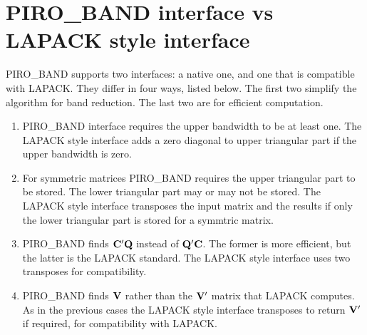 \documentclass[11pt]{article}
\newcommand{\m}[1]{{\bf{#1}}}       %
\begin{document}
\newpage \section{PIRO\_BAND interface vs LAPACK style interface}

PIRO\_BAND supports two interfaces:  a native one, and one that is compatible
with LAPACK.  They differ in four ways, listed below.  The first two simplify
the algorithm for band reduction.  The last two are for efficient computation.

\begin{enumerate}
\item
PIRO\_BAND interface requires the upper bandwidth to be at least one. The
LAPACK style interface adds a zero diagonal to upper triangular part if the
upper bandwidth is zero.

\item
For symmetric matrices PIRO\_BAND requires the upper triangular part to be
stored. The lower triangular part may or may not be stored. The LAPACK style
interface transposes the input matrix and the results if only the lower
triangular part is stored for a symmtric matrix.

\item
PIRO\_BAND finds $\m{C}'\m{Q}$ instead of $\m{Q}'\m{C}$.  The former is more
efficient, but the latter is the LAPACK standard.  The LAPACK style interface
uses two transposes for compatibility. 

\item
PIRO\_BAND finds $\m{V}$ rather than the $\m{V'}$ matrix that LAPACK computes.
As in the previous cases the LAPACK style interface transposes to
return $\m{V'}$ if required, for compatibility with LAPACK.
\end{enumerate}
\end{document}
